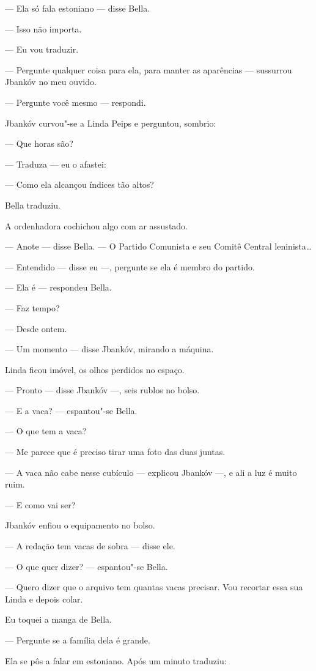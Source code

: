 --- Ela só fala estoniano --- disse Bella.

--- Isso não importa.

--- Eu vou traduzir.

--- Pergunte qualquer coisa para ela, para manter as aparências
--- sussurrou Jbankóv no meu ouvido.

--- Pergunte você mesmo --- respondi.

Jbankóv curvou"-se a Linda Peips e perguntou, sombrio:

--- Que horas são?

--- Traduza --- eu o afastei:

--- Como ela alcançou índices tão altos?

Bella traduziu.

A ordenhadora cochichou algo com ar assustado.

--- Anote --- disse Bella. --- O Partido Comunista
e seu Comitê Central leninista\ldots{}

--- Entendido --- disse eu ---, pergunte se ela é
membro do partido.

--- Ela é --- respondeu Bella.

--- Faz tempo?

--- Desde ontem.

--- Um momento --- disse Jbankóv, mirando a máquina.

Linda ficou imóvel, os olhos perdidos no espaço.

--- Pronto --- disse Jbankóv ---, seis rublos no
bolso.

--- E a vaca? --- espantou"-se Bella.

--- O que tem a vaca?

--- Me parece que é preciso tirar uma foto das duas juntas.

--- A vaca não cabe nesse cubículo --- explicou Jbankóv
---, e ali a luz é muito ruim.

--- E como vai ser?

Jbankóv enfiou o equipamento no bolso.

--- A redação tem vacas de sobra --- disse ele.

--- O que quer dizer? --- espantou"-se Bella.

--- Quero dizer que o arquivo tem quantas vacas precisar. Vou
recortar essa sua Linda e depois colar.

Eu toquei a manga de Bella.

--- Pergunte se a família dela é grande.

Ela se pôs a falar em estoniano. Após um minuto traduziu:

